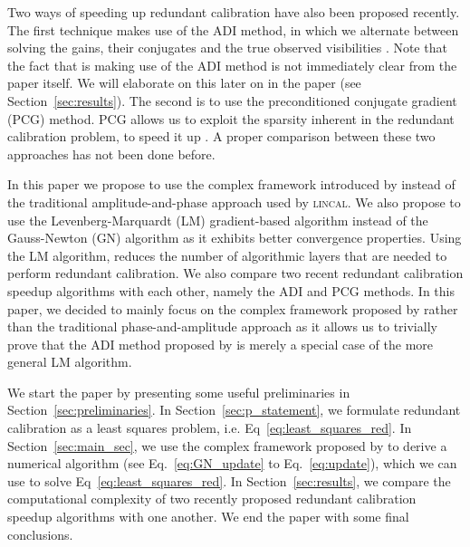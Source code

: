 \documentclass[useAMS,usenatbib]{mn2e}
\begin{document}
Two ways of speeding up redundant calibration have also been proposed recently. The first technique makes use of the ADI method, in which we alternate between solving the gains, their conjugates and 
the true observed visibilities \citep{Wijnholds2012,Marthi2014}. Note that the fact that \citet{Marthi2014} is making use of the ADI method is not immediately clear
from the paper itself. We will elaborate on this later on in the paper (see Section~\ref{sec:results}). The second is to use the preconditioned conjugate gradient (PCG) method. PCG allows us to exploit the sparsity inherent in the redundant calibration problem, 
to speed it up \citep{Liu2010}. A proper comparison between these two approaches has not been done before.

In this paper we propose to use the complex framework introduced by \citet{Smirnov2015} instead of the traditional amplitude-and-phase approach used by \textsc{lincal}.
We also propose to use the Levenberg-Marquardt (LM) gradient-based algorithm instead of the Gauss-Newton (GN) algorithm as it exhibits better convergence properties.
Using the LM algorithm, reduces the number of algorithmic layers that are needed to perform redundant calibration. 
We also compare two recent redundant calibration speedup algorithms with each other, namely the ADI \citep{Marthi2014} and PCG \citep{Liu2010} methods. In this paper, we decided to mainly focus on the complex framework proposed by \citet{Smirnov2015} rather than the traditional phase-and-amplitude approach as it 
allows us to trivially prove that the ADI method proposed by \citep{Marthi2014} is merely a special case of the more general LM algorithm. 


We start the paper by presenting some useful preliminaries in Section~\ref{sec:preliminaries}. In Section~\ref{sec:p_statement}, we formulate redundant calibration 
as a least squares problem, i.e. Eq~\eqref{eq:least_squares_red}. In Section~\ref{sec:main_sec}, we use the complex framework proposed by \citet{Smirnov2015} to derive a numerical
algorithm (see Eq.~\eqref{eq:GN_update} to Eq.~\eqref{eq:update}), which we can use to solve Eq~\eqref{eq:least_squares_red}. In Section~\ref{sec:results}, we compare the computational complexity of two recently proposed redundant calibration speedup algorithms with one another.
We end the paper with some final conclusions.
\end{document}
